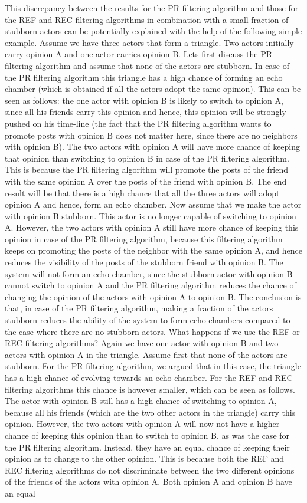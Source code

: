 \documentclass[11 pt , letterpaper , twoside , openright]{book}
\begin{document}
This discrepancy between the results for the PR filtering algorithm and those for the REF and REC filtering algorithms in combination with a small fraction of stubborn actors can be potentially explained with the help of the following simple example. Assume we have three actors that form a triangle. Two actors initially carry opinion A and one actor carries opinion B. Lets first discuss the PR filtering algorithm and assume that none of the actors are stubborn. In case of the PR filtering algorithm this triangle has a high chance of forming an echo chamber (which is obtained if all the actors adopt the same opinion). This can be seen as follows: the one actor with opinion B is likely to switch to opinion A, since all his friends carry this opinion and hence, this opinion will be strongly pushed on his time-line (the fact that the PR filtering algorithm wants to promote posts with opinion B does not matter here, since there are no neighbors with opinion B). The two actors with opinion A will have more chance of keeping that opinion than switching to opinion B in case of the PR filtering algorithm. This is because the PR filtering algorithm will promote the posts of the friend with the same opinion A over the posts of the friend with opinion B. The end result will be that there is a high chance that all the three actors will adopt opinion A and hence, form an echo chamber. Now assume that we make the actor with opinion B stubborn. This actor is no longer capable of switching to opinion A. However, the two actors with opinion A still have more chance of keeping this opinion in case of the PR filtering algorithm, because this filtering algorithm keeps on promoting the posts of the neighbor with the same opinion A, and hence reduces the visibility of the posts of the stubborn friend with opinion B. The system will not form an echo chamber, since the stubborn actor with opinion B cannot switch to opinion A and the PR filtering algorithm reduces the chance of changing the opinion of the actors with opinion A to opinion B. The conclusion is that, in case of the PR filtering algorithm, making a fraction of the actors stubborn reduces the ability of the system to form echo chambers compared to the case where there are no stubborn actors. What happens if we use the REF or REC filtering algorithms? Again we have one actor with opinion B and two actors with opinion A in the triangle. Assume first that none of the actors are stubborn. For the PR filtering algorithm, we argued that in this case, the triangle has a high chance of evolving towards an echo chamber. For the REF and REC filtering algorithms this chance is however smaller, which can be seen as follows. The actor with opinion B still has a high chance of switching to opinion A, because all his friends (which are the two other actors in the triangle) carry this opinion. However, the two actors with opinion A will now not have a higher chance of keeping this opinion than to switch to opinion B, as was the case for the PR filtering algorithm. Instead, they have an equal chance of keeping their opinion as to change to the other opinion. This is because both the REF and REC filtering algorithms do not discriminate between the two different opinions of the friends of the actors with opinion A. Both opinion A and opinion B have an equal 
\end{document}
